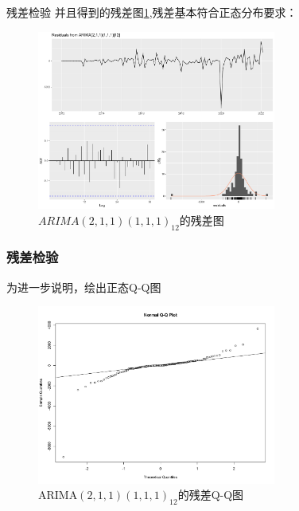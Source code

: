 \documentclass[10pt]{beamer}
\begin{document}
\begin{frame}{残差检验}
  并且得到的残差图\ref{Redsiduals},残差基本符合正态分布要求：
  \begin{figure}[H] %
  \centering %
  \includegraphics[width=0.7\textwidth]{figures/Residuals.pdf} %
  \caption{\(ARIMA(2,1,1)(1,1,1)_{12}\)的残差图} %
  \label{Redsiduals} %
  \end{figure} 
\end{frame}

\begin{frame}
  \frametitle{残差检验}
  为进一步说明，绘出正态Q-Q图

  \begin{figure}[H] %
    \centering %
    \includegraphics[width=0.7\textwidth]{figures/Q-Qplot.pdf} %
    \caption{\small{ARIMA\((2,1,1)(1,1,1)_{12}\)的残差Q-Q图}} %
    \label{Q-Qplot} %
  \end{figure} 
\end{frame}
\end{document}
